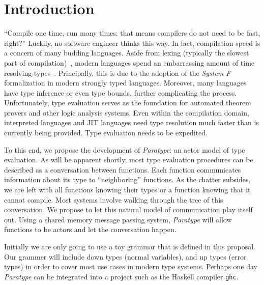 \documentclass{acm_proc_article-sp}
\begin{document}


\section{Introduction}


``Compile one time, run many times: that means compilers do not need to be
fast, right?'' Luckily, no software engineer thinks this way. In fact,
compilation speed is a concern of many budding languages. Aside from lexing
(typically the slowest part of compilation)~\cite{bright:blog}, modern
languages spend an embarrassing amount of time resolving
types~\cite{junaidu:phd}. Principally, this is due to the adoption of the
\emph{System F} formalization in modern strongly typed languages. Moreover,
many languages have type inference or even type bounds, further complicating
the process. Unfortunately, type evaluation serves as the foundation for
automated theorem provers and other logic analysis systems. Even within the
compilation domain, interpreted languages and JIT languages need type
resolution much faster than is currently being provided. Type evaluation needs
to be expedited.

To this end, we propose the development of \emph{Paratype}: an actor model of
type evaluation. As will be apparent shortly, most type evaluation procedures
can be described as a conversation between functions. Each function
communicates information about its type to ``neighboring'' functions. As the
chatter subsides, we are left with all functions knowing their types or a
function knowing that it cannot compile. Most systems involve walking through
the tree of this conversation. We propose to let this natural model of
communication play itself out. Using a shared memory message passing system,
\emph{Paratype} will allow functions to be actors and let the conversation
happen.

Initially we are only going to use a toy grammar that is defined in this
proposal. Our grammer will include down types (normal variables), and up types
(error types) in order to cover most use cases in modern type systems. Perhaps
one day \emph{Paratype} can be integrated into a project such as the Haskell
compiler \texttt{ghc}.
\end{document}

